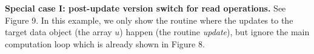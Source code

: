 \begin{comment}
It is possible to rely on a compiler to apply the basic rule to the application.
We introduce a compiler pass that automatically transform the application into the in-place versioning based on the analysis of read and write operations. 

However, the basic rule of in-place versioning 
has an implicit requirement: within an iteration of the main loop, all data elements of the target data objects are updated in a uniform way and only updated once. This assumption is true for some applications. For example,in the benchmark NPB BT, a distributed mesh structure for checkpoint is only updated once and uniformly at the end of each iteration by inter-process communication.
However, some applications update their data objects in a way
that does not meet the requirement.
We discuss those cases as follows.
\end{comment}

\begin{comment}
The naive idea of dual version need to be polished when applied to practical cases. First kind of special cases is inconsistent update of data objects which make it unable to implement dual version. The second kind of special cases is that multiple updates occur in single iteration.
\end{comment}

\textbf{Special case I: post-update version switch for read operations.}
See Figure 9. In this example, we only show the routine where the updates to the target data object (the array $u$) happen (the routine \textit{update}), but ignore the main computation loop which is already shown in Figure 8.

